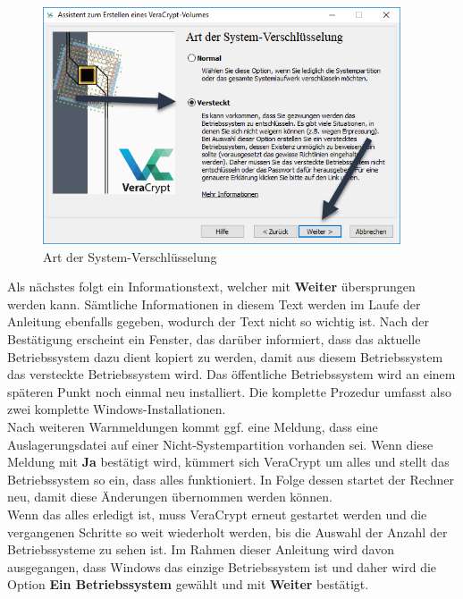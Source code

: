 \documentclass[12pt,a4paper]{scrreprt}
\begin{document}
\begin{figure}[h]
\begin{center}
\includegraphics[width=300pt]{media/hb5.png}
\caption{Art der System-Verschlüsselung}
\label{hb5}
\end{center}
\end{figure}

\newpage

\noindent Als nächstes folgt ein Informationstext, welcher mit \textbf{Weiter} übersprungen werden kann. Sämtliche Informationen in diesem Text werden im Laufe der Anleitung ebenfalls gegeben, wodurch der Text nicht so wichtig ist. Nach der Bestätigung erscheint ein Fenster, das darüber informiert, dass das aktuelle Betriebssystem dazu dient kopiert zu werden, damit aus diesem Betriebssystem das versteckte Betriebssystem wird. Das öffentliche Betriebssystem wird an einem späteren Punkt noch einmal neu installiert. Die komplette Prozedur umfasst also zwei komplette Windows-Installationen. \\

\noindent Nach weiteren Warnmeldungen kommt ggf. eine Meldung, dass eine Auslagerungsdatei auf einer Nicht-Systempartition vorhanden sei. Wenn diese Meldung mit \textbf{Ja} bestätigt wird, kümmert sich VeraCrypt um alles und stellt das Betriebssystem so ein, dass alles funktioniert. In Folge dessen startet der Rechner neu, damit diese Änderungen übernommen werden können. \\

\noindent Wenn das alles erledigt ist, muss VeraCrypt erneut gestartet werden und die vergangenen Schritte so weit wiederholt werden, bis die Auswahl der Anzahl der Betriebssysteme zu sehen ist. Im Rahmen dieser Anleitung wird davon ausgegangen, dass Windows das einzige Betriebssystem ist und daher wird die Option \textbf{Ein Betriebssystem} gewählt und mit \textbf{Weiter} bestätigt.
\end{document}
